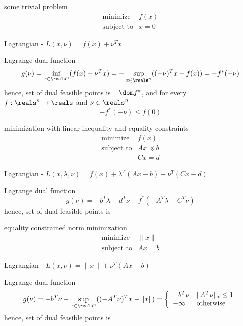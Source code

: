 \documentclass[17pt,landscape]{foils}
\begin{document}
{\item
	some trivial problem
	$$
		\begin{array}{ll}
			\mbox{minimize} &
				f(x)
			\\
			\mbox{subject to} &
				x=0
		\end{array}
	$$
	\bit
	\item
		Lagrangian - $L(x,\nu) =f(x)+\nu^Tx$
	\item
		Lagrange dual function
		$$
			g(\nu) = \inf_{x\in\reals^n} (f(x)+\nu^Tx)
			= -\sup_{x\in\reals^n} ((-\nu)^Tx-f(x))
			= - f^\ast(-\nu)
		$$
		\bit
		\iitem
			hence, set of dual feasible points is $-\dom f^\ast$,
			and
			for every $f:\reals^n\to\reals$ and $\nu\in\reals^n$
			$$
				-f^\ast(-\nu) \leq f(0)
			$$
		\eit
	\eit

\item
	minimization with linear inequality and equality constraints
	$$
		\begin{array}{ll}
			\mbox{minimize} &
				f(x)
			\\
			\mbox{subject to} &
				Ax\preceq b
			\\ &
				Cx= d
		\end{array}
	$$
	\bit
	\item
		Lagrangian - $L(x,\lambda, \nu) = f(x) + \lambda^T(Ax-b) + \nu^T(Cx-d)$
	\item
		Lagrange dual function
		$$
			g(\nu) = -b^T\lambda - d^T\nu - f^\ast(-A^T \lambda - C^T\nu)
		$$
		\bit
		\iitem
			hence, set of dual feasible points
			is 
		\eit
	\eit

\item
	equality constrained norm minimization
	$$
		\begin{array}{ll}
			\mbox{minimize} &
				\|x\|
			\\
			\mbox{subject to} &
				Ax = b
		\end{array}
	$$
	\bit
	\item
		Lagrangian - $L(x,\nu) = \|x\| + \nu^T(Ax-b)$
	\item
		Lagrange dual function
		$$
			g(\nu) = -b^T\nu -\sup_{x\in\reals^n} ((-A^T\nu)^Tx - \|x\|)
			= \left\{\begin{array}{ll}
				-b^T \nu&\|A^T\nu\|_\ast\leq1
				\\
				- \infty & \mbox{otherwise}
			\end{array}\right.
		$$
		\bit
		\iitem
			hence, set of dual feasible points
			is 
		\eit
	\eit

}
\end{document}
